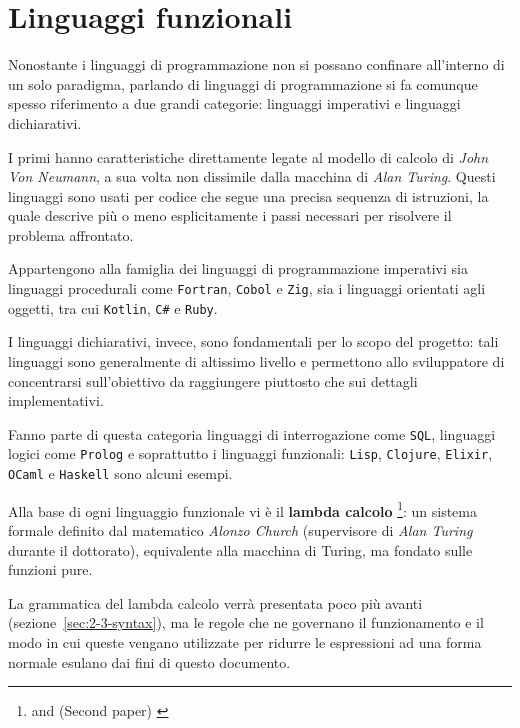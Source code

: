 \section{Linguaggi funzionali}
\label{sec:2-1-functional-languages}

Nonostante i linguaggi di programmazione non si possano confinare all'interno di un solo paradigma,
parlando di linguaggi di programmazione si fa comunque spesso riferimento a due grandi categorie:
linguaggi imperativi e linguaggi dichiarativi.


I primi hanno caratteristiche direttamente legate al modello di calcolo di \textit{John Von Neumann},
a sua volta non dissimile dalla macchina di \textit{Alan Turing}.
Questi linguaggi sono usati per codice che segue una precisa sequenza di istruzioni,
la quale descrive più o meno esplicitamente i passi necessari per risolvere il problema affrontato.

\noindent Appartengono alla famiglia dei linguaggi di programmazione imperativi sia linguaggi procedurali come
\texttt{Fortran}, \texttt{Cobol} e \texttt{Zig}, sia i linguaggi orientati agli oggetti, tra cui \texttt{Kotlin}, \texttt{C\#} e \texttt{Ruby}.


I linguaggi dichiarativi, invece, sono fondamentali per lo scopo del progetto:
tali linguaggi sono generalmente di altissimo livello e permettono allo sviluppatore
di concentrarsi sull'obiettivo da raggiungere piuttosto che sui dettagli implementativi.

\noindent Fanno parte di questa categoria linguaggi di interrogazione come \texttt{SQL},
linguaggi logici come \texttt{Prolog} e soprattutto i linguaggi funzionali:
\texttt{Lisp}, \texttt{Clojure}, \texttt{Elixir}, \texttt{OCaml} e \texttt{Haskell} sono alcuni esempi.


Alla base di ogni linguaggio funzionale vi è il \textbf{lambda calcolo}%
\footnote{ \cite{Church-1932-FoundationLogic}
      and  (Second paper) \cite{Church-1933-FoundationLogic}}:
un sistema formale definito dal matematico \textit{Alonzo Church} (supervisore di \textit{Alan Turing} durante il dottorato),
equivalente alla macchina di Turing, ma fondato sulle funzioni pure.

\newpage

\noindent La grammatica del lambda calcolo verrà presentata poco più avanti (sezione~\ref{sec:2-3-syntax}),
ma le regole che ne governano il funzionamento e il modo in cui queste vengano utilizzate per ridurre
le espressioni ad una forma normale esulano dai fini di questo documento.

